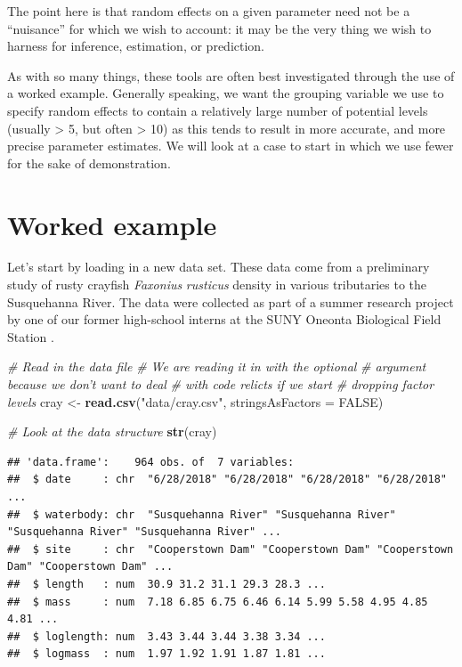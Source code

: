 \documentclass[
]{book}
\newenvironment{Shaded}{\begin{snugshade}}{\end{snugshade}}
\newcommand{\CommentTok}[1]{\textcolor[rgb]{0.56,0.35,0.01}{\textit{#1}}}
\newcommand{\DataTypeTok}[1]{\textcolor[rgb]{0.13,0.29,0.53}{#1}}
\newcommand{\KeywordTok}[1]{\textcolor[rgb]{0.13,0.29,0.53}{\textbf{#1}}}
\newcommand{\NormalTok}[1]{#1}
\newcommand{\OtherTok}[1]{\textcolor[rgb]{0.56,0.35,0.01}{#1}}
\newcommand{\StringTok}[1]{\textcolor[rgb]{0.31,0.60,0.02}{#1}}
\begin{document}
The point here is that random effects on a given parameter need not be a ``nuisance'' for which we wish to account: it may be the very thing we wish to harness for inference, estimation, or prediction.

As with so many things, these tools are often best investigated through the use of a worked example. Generally speaking, we want the grouping variable we use to specify random effects to contain a relatively large number of potential levels (usually \textgreater{} 5, but often \textgreater{} 10) as this tends to result in more accurate, and more precise parameter estimates. We will look at a case to start in which we use fewer for the sake of demonstration.

\hypertarget{lmm-worked}{%
\section{Worked example}\label{lmm-worked}}

Let's start by loading in a new data set. These data come from a preliminary study of rusty crayfish \emph{Faxonius} \emph{rusticus} density in various tributaries to the Susquehanna River. The data were collected as part of a summer research project by one of our former high-school interns at the SUNY Oneonta Biological Field Station .

\begin{Shaded}
\begin{Highlighting}[]
\CommentTok{# Read in the data file}
\CommentTok{# We are reading it in with the optional}
\CommentTok{# argument because we don't want to deal}
\CommentTok{# with code relicts if we start}
\CommentTok{# dropping factor levels}
\NormalTok{cray <-}\StringTok{ }\KeywordTok{read.csv}\NormalTok{(}\StringTok{"data/cray.csv"}\NormalTok{, }\DataTypeTok{stringsAsFactors =} \OtherTok{FALSE}\NormalTok{)}
\end{Highlighting}
\end{Shaded}

\begin{Shaded}
\begin{Highlighting}[]
\CommentTok{# Look at the data structure}
\KeywordTok{str}\NormalTok{(cray)}
\end{Highlighting}
\end{Shaded}

\begin{verbatim}
## 'data.frame':	964 obs. of  7 variables:
##  $ date     : chr  "6/28/2018" "6/28/2018" "6/28/2018" "6/28/2018" ...
##  $ waterbody: chr  "Susquehanna River" "Susquehanna River" "Susquehanna River" "Susquehanna River" ...
##  $ site     : chr  "Cooperstown Dam" "Cooperstown Dam" "Cooperstown Dam" "Cooperstown Dam" ...
##  $ length   : num  30.9 31.2 31.1 29.3 28.3 ...
##  $ mass     : num  7.18 6.85 6.75 6.46 6.14 5.99 5.58 4.95 4.85 4.81 ...
##  $ loglength: num  3.43 3.44 3.44 3.38 3.34 ...
##  $ logmass  : num  1.97 1.92 1.91 1.87 1.81 ...
\end{verbatim}
\end{document}

